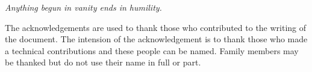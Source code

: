 \begin{acknowledgements}

\begin{center}
      \emph{Anything begun in vanity ends in humility.}
\end{center}
 
The acknowledgements are used to thank those who
contributed to the writing of the document.  The intension of the
acknowledgement is to thank those who made a technical contributions
and these people can be named.  Family members may be thanked but do
not use their name in full or part.  

\end{acknowledgements}



